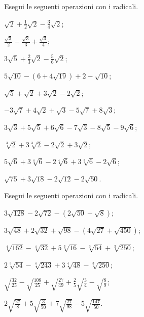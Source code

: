 \begin{esercizio}[\Ast]
 \label{ese:2.51}
Esegui le seguenti operazioni con i radicali.
 \begin{multicols}{2}
 \begin{enumeratea}
 \item $\sqrt 2+\frac 1 2\sqrt 2-\frac 3 4\sqrt 2$;
 \item $\frac{\sqrt 3} 2-\frac{\sqrt 3} 3+\frac{\sqrt 3} 4$;
 \item $3\sqrt 5+\frac 2 3\sqrt 2-\frac 5 6\sqrt 2$;
 \item $5\sqrt{10}-\left(6+4\sqrt{19}\right)+2-\sqrt{10}$;
 \item $\sqrt 5+\sqrt 2+3\sqrt 2-2\sqrt 2$;
 \item $-3\sqrt 7+4\sqrt 2+\sqrt 3-5\sqrt 7+8\sqrt 3$;
 \item $3\sqrt 3+5\sqrt 5+6\sqrt 6-7\sqrt 3-8\sqrt 5-9\sqrt 6$;
 \item $\sqrt[3]2+3\sqrt[3]2-2\sqrt 2+3\sqrt 2$;
 \item $5\sqrt 6+3\sqrt[4]6-2\sqrt[4]6+3\sqrt[3]6-2\sqrt 6$;
 \item $\sqrt{75}+3\sqrt{18}-2\sqrt{12}-2\sqrt{50}$.
 \end{enumeratea}
 \end{multicols}
\end{esercizio}

\begin{esercizio}[\Ast]
 \label{ese:2.52}
Esegui le seguenti operazioni con i radicali.
 \begin{multicols}{2}
 \begin{enumeratea}
 \item $3\sqrt{128}-2\sqrt{72}-(2\sqrt{50}+\sqrt 8)$;
 \item $3\sqrt{48}+2\sqrt{32}+\sqrt{98}-(4\sqrt{27}+\sqrt{450})$;
 \item $\sqrt[4]{162}-\sqrt[4]{32}+5\sqrt[3]{16}-\sqrt[3]{54}+\sqrt[3]{250}$;
 \item $2\sqrt[3]{54}-\sqrt[4]{243}+3\sqrt[4]{48}-\sqrt[3]{250}$;
 \item $\sqrt{\frac{32}{25}}-\sqrt{\frac{108}{25}}+\sqrt{\frac{27}{49}}+\frac 2 5\sqrt{\frac 3 4}-\sqrt{\frac 8 9}$;
 \item $2\sqrt{\frac{27} 8}+5\sqrt{\frac 3{50}}+7\sqrt{\frac{27}{98}}-5\sqrt{\frac{147}{50}}$.
 \end{enumeratea}
 \end{multicols}
\end{esercizio}

